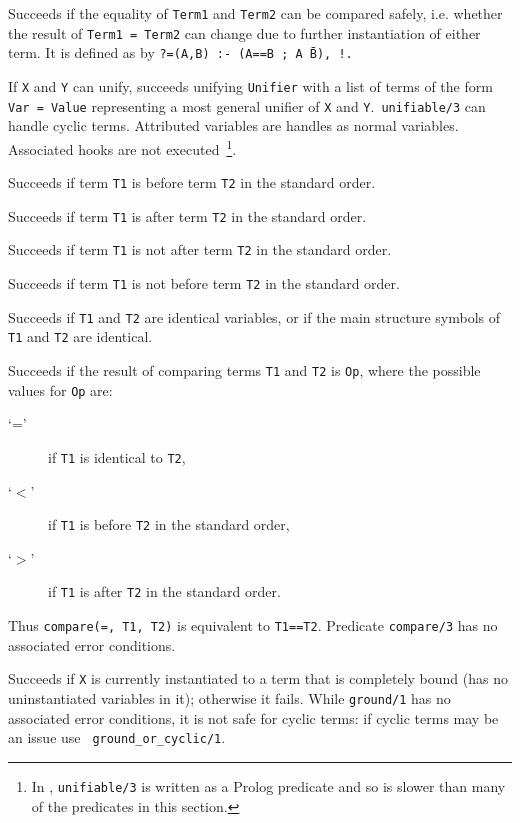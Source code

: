 \begin{description}
%
Succeeds if the equality of {\tt Term1} and {\tt Term2} can be
compared safely, i.e. whether the result of {\tt Term1 = Term2} can
change due to further instantiation of either term. It is defined as
by {\tt ?=(A,B) :- (A==B ; A \= B), !.} 

%
If {\tt X} and {\tt Y} can unify, succeeds unifying {\tt Unifier} with
a list of terms of the form {\tt Var = Value} representing a most
general unifier of {\tt X} and {\tt Y}.\  {\tt unifiable/3} can handle
cyclic terms. Attributed variables are handles as normal
variables. Associated hooks are not executed~\footnote{In \version ,
  {\tt unifiable/3} is written as a Prolog predicate and so is slower
  than many of the predicates in this section.}.

    Succeeds if term {\tt T1} is before term {\tt T2} in the standard order.

    Succeeds if term {\tt T1} is after term {\tt T2} in the standard order.

    Succeeds if term {\tt T1} is not after term {\tt T2} in the standard order.

    Succeeds if term {\tt T1} is not before term {\tt T2} in the standard order.

    Succeeds if {\tt T1} and {\tt T2} are identical variables, or if
    the main structure symbols of {\tt T1} and {\tt T2} are identical.

    Succeeds if the result of comparing terms {\tt T1} and {\tt T2} 
    is {\tt Op}, where the possible values for {\tt Op} are:
    \begin{description}
    \item[`='] if {\tt T1} is identical to {\tt T2},
    \item[`$<$'] if {\tt T1} is before {\tt T2} in the standard order,
    \item[`$>$'] if {\tt T1} is after {\tt T2} in the standard order.
    \end{description}
    Thus {\tt compare(=, T1, T2)} is equivalent to {\tt T1==T2}.
    Predicate {\tt compare/3} has no associated error conditions.

%
Succeeds if {\tt X} is currently instantiated to a term that is
completely bound (has no uninstantiated variables in it); otherwise it
fails.  While {\tt ground/1} has no associated error conditions, it is
not safe for cyclic terms: if cyclic terms may be an issue use {\tt
  ground\_or\_cyclic/1}.


\end{description}
